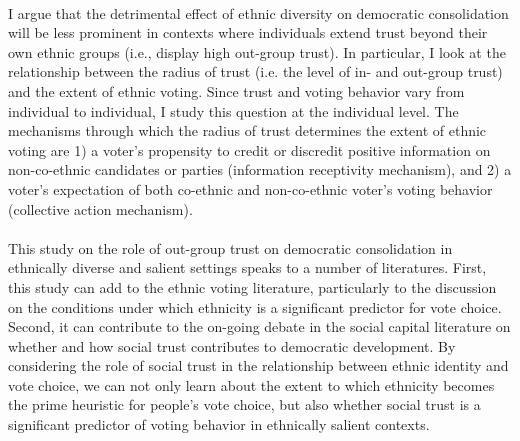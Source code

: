 \documentclass[a4paper, 12pt]{article}
\begin{document}
\paragraph{}
I argue that the detrimental effect of ethnic diversity on democratic consolidation will be less prominent in contexts where individuals extend trust beyond their own ethnic groups (i.e., display high out-group trust). In particular, I look at the relationship between the radius of trust (i.e. the level of in- and out-group trust) and the extent of ethnic voting\cite{houleDoesEthnicVoting2018}. Since trust and voting behavior vary from individual to individual, I study this question at the individual level. The mechanisms through which the radius of trust determines the extent of ethnic voting are 1) a voter’s propensity to credit or discredit positive information on non-co-ethnic candidates or parties (information receptivity mechanism), and 2) a voter’s expectation of both co-ethnic and non-co-ethnic voter’s voting behavior (collective action mechanism).
\paragraph{}
This study on the role of out-group trust on democratic consolidation in ethnically diverse and salient settings speaks to a number of literatures. First, this study can add to the ethnic voting literature, particularly to the discussion on the conditions under which ethnicity is a significant predictor for vote choice\cite{chandraWhyEthnicParties2004, conroy-krutzInformationEthnicPolitics2013, posnerPoliticalSalienceCultural2004, dunningCrosscuttingCleavagesEthnic2010}. Second, it can contribute to the on-going debate in the social capital literature on whether and how social trust contributes to democratic development\cite{almondCivicCulturePolitical1989, inglehartRenaissancePoliticalCulture1988, mullerCivicCultureDemocracy1994a, inglehartPoliticalCultureDemocracy2003, rafaellaportaTrustLargeOrganizations1997, putnamWhatMakesDemocracy1993, riceSocialCapitalGovernment2001, knackSocialCapitalQuality2002a, uslanerMoralFoundationsTrust2002, backWhenTrustMatters2016, crepazWhatTrustGot2017a}. By considering the role of social trust in the relationship between ethnic identity and vote choice, we can not only learn about the extent to which ethnicity becomes the prime heuristic for people’s vote choice, but also whether social trust is a significant predictor of voting behavior in ethnically salient contexts.
\end{document}
